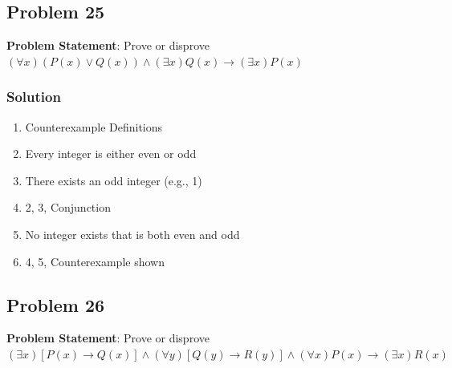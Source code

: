 \documentclass[12pt]{article}
\begin{document}
\newpage
\subsection*{Problem 25}
\textbf{Problem Statement}: Prove or disprove \( (\forall x)(P(x)\lor Q(x))\land (\exists x)Q(x)\rightarrow (\exists x)P(x) \)

\subsubsection*{Solution}
\begin{enumerate}[left=0em,labelwidth=4em,align=left]
    \item[\( \text{Let } P(x): x \text{ is even}, Q(x): x \text{ is odd} \)] \hfill Counterexample Definitions
    \item[\( \forall x (P(x) \lor Q(x)) \)] \hfill Every integer is either even or odd
    \item[\( \exists x Q(x) \)] \hfill There exists an odd integer (e.g., 1)
    \item[\( (\forall x)(P(x)\lor Q(x))\land (\exists x)Q(x) \)] \hfill 2, 3, Conjunction
    \item[\( \nexists x P(x) \)] \hfill No integer exists that is both even and odd
    \item[\( (\forall x)(P(x)\lor Q(x))\land (\exists x)Q(x)\nrightarrow (\exists x)P(x) \)] \hfill 4, 5, Counterexample shown
\end{enumerate}


\newpage
\subsection*{Problem 26}
\textbf{Problem Statement}: Prove or disprove \( (\exists x)[P(x)\rightarrow Q(x)]\land (\forall y)[Q(y)\rightarrow R(y)]\land (\forall x)P(x)\rightarrow (\exists x)R(x) \)
\end{document}
